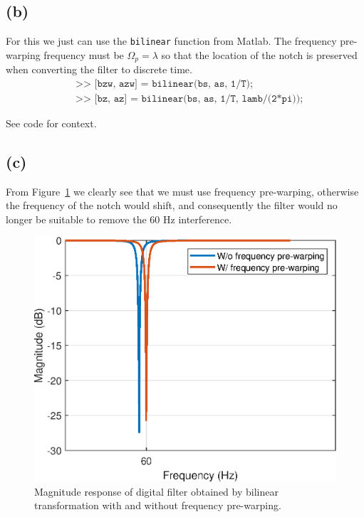\documentclass{article}
\begin{document}
\subsection{(b)}

For this we just can use the \texttt{bilinear} function from Matlab. The frequency pre-warping frequency must be $\Omega_p = \lambda$ so that the location of the notch is preserved when converting the filter to discrete time.
\begin{align*}
	&\texttt{>> [bzw, azw] = bilinear(bs, as, 1/T);} \tag{without frequency pre-warping} \\
	&\texttt{>> [bz, az] = bilinear(bs, as, 1/T, lamb/(2*pi));} \tag{with frequency pre-warping}
\end{align*}

See code for context.

\subsection{(c)}

From Figure~\ref{fig:egc:bilinear-mag} we clearly see that we must use frequency pre-warping, otherwise the frequency of the notch would shift, and consequently the filter would no longer be suitable to remove the 60 Hz interference. 

\FloatBarrier
\begin{figure}[h!]
	\centering
	\includegraphics[scale=0.7]{figs/bilinear_ecg.eps}
	\caption{Magnitude response of digital filter obtained by bilinear transformation with and without frequency pre-warping.} \label{fig:egc:bilinear-mag}
\end{figure}
\FloatBarrier
\end{document}
